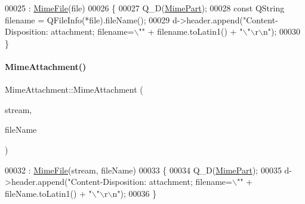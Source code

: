 \begin{DoxyCode}
00025                                           : \hyperlink{class_simple_mail_1_1_mime_file_a813f54f8423832b33fac1a85820bdb4a}{MimeFile}(file)
00026 \{
00027     Q\_D(\hyperlink{class_simple_mail_1_1_mime_part}{MimePart});
00028     \textcolor{keyword}{const} QString filename = QFileInfo(*file).fileName();
00029     d->header.append(\textcolor{stringliteral}{"Content-Disposition: attachment; filename=\(\backslash\)""} + filename.toLatin1() + \textcolor{stringliteral}{"\(\backslash\)"\(\backslash\)r\(\backslash\)n"});
00030 \}
\end{DoxyCode}
\mbox{\label{class_simple_mail_1_1_mime_attachment_a70681801131cf35515daaf4dd2d35cba}} 
\paragraph{\texorpdfstring{Mime\+Attachment()}{MimeAttachment()}\hspace{0.1cm}{\footnotesize\ttfamily [2/2]}}
{\footnotesize\ttfamily Mime\+Attachment\+::\+Mime\+Attachment (\begin{DoxyParamCaption}\item[{const Q\+Byte\+Array \&}]{stream,  }\item[{const Q\+String \&}]{file\+Name }\end{DoxyParamCaption})}


\begin{DoxyCode}
00032                                                                                : 
      \hyperlink{class_simple_mail_1_1_mime_file_a813f54f8423832b33fac1a85820bdb4a}{MimeFile}(stream, fileName)
00033 \{
00034     Q\_D(\hyperlink{class_simple_mail_1_1_mime_part}{MimePart});
00035     d->header.append(\textcolor{stringliteral}{"Content-Disposition: attachment; filename=\(\backslash\)""} + fileName.toLatin1() + \textcolor{stringliteral}{"\(\backslash\)"\(\backslash\)r\(\backslash\)n"});
00036 \}
\end{DoxyCode}
\mbox{\label{class_simple_mail_1_1_mime_attachment_aac25990be48662219fdf34013fd9871d}} 
